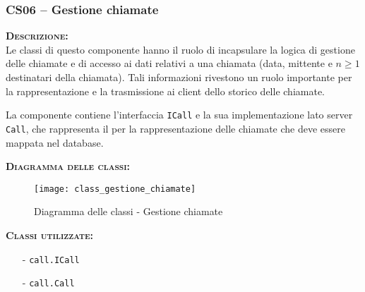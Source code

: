 \subsubsection{CS06 -- Gestione chiamate}
\begin{description}
  \item{\scshape\bfseries Descrizione:}\\
Le classi di questo componente hanno il ruolo di incapsulare la logica di gestione delle chiamate e di accesso ai dati relativi a una chiamata (data, mittente e $n\geq1$ destinatari della chiamata). Tali informazioni rivestono un ruolo importante per la rappresentazione e la trasmissione ai client dello storico delle chiamate.

La componente contiene l'interfaccia \texttt{ICall} e la sua implementazione lato server \texttt{Call}, che rappresenta il  per la rappresentazione delle chiamate che deve essere mappata nel database.

  \item{\scshape\bfseries Diagramma delle classi:}
\begin{figure}[H]
  \centering
  \texttt{[image: class\_gestione\_chiamate]}
  \caption{Diagramma delle classi - Gestione chiamate}\label{fig:gestionechiamate}
\end{figure}

  \item{\scshape\bfseries Classi utilizzate:}\\
  \begin{itemize}[noitemsep,nolistsep]
    \item[-] \texttt{call.ICall}
    \item[-] \texttt{call.Call}
  \end{itemize}
\end{description}

